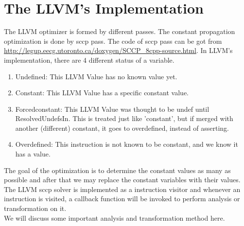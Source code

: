 \section{The LLVM’s Implementation}
The LLVM optimizer is formed by different passes. The constant propagation optimization is done by sccp pass. The code of sccp pass can be got from \url{http://legup.eecg.utoronto.ca/doxygen/SCCP_8cpp-source.html}.
In LLVM’s implementation, there are 4 different status of a variable.
\begin{enumerate}
\item Undefined: This LLVM Value has no known value yet.
\item Constant: This LLVM Value has a specific constant value.
\item Forcedconstant: This LLVM Value was thought to be undef until ResolvedUndefsIn.  This is treated just like 'constant', but if merged with another (different) constant, it goes to overdefined, instead of asserting.
\item Overdefined: This instruction is not known to be constant, and we know it has a value.
\end{enumerate}
The goal of the optimization is to determine the constant values as many as possible and after that we may replace the constant variables with their values. \\
The LLVM sccp solver is implemented as a instruction visitor and whenever an instruction is visited, a callback function will be invoked to perform analysis or transformation on it. \\
We will discuss some important analysis and transformation method here.

